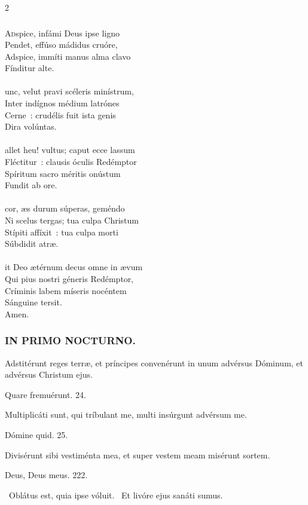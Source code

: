 \documentclass[9pt,twoside]{extarticle}
\begin{document}
\begin{multicols}{2}
{{\subsubsection*{\center{}}
\lettrine{A}dspice, infámi Deus ipse ligno\\
Pendet, effúso mádidus cruóre,\\
Adspice, immíti manus alma clavo\\
Fínditur alte.\\
\\
unc, velut pravi scéleris minístrum,\\
Inter indígnos médium latrónes\\
Cerne~: crudélis fuit ista genis\\
Dira volúntas.\\
\\
allet heu! vultus; caput ecce lassum\\
Fléctitur~: clausis óculis Redémptor\\
Spíritum sacro méritis onústum\\
Fundit ab ore.\\
\\
 cor, æs durum súperas, geméndo\\
Ni scelus tergas; tua culpa Christum\\
Stípiti affíxit~: tua culpa morti\\
Súbdidit atræ.\\
\\
it Deo ætérnum decus omne in ævum\\
Qui pius nostri géneris Redémptor,\\
Críminis labem míseris nocéntem\\
Sánguine tersit.\\
Amen.

\subsubsection*{\center \textsc{IN PRIMO NOCTURNO.}}
\begin{tightlist}{}
\item {} Adstitérunt reges terræ, et príncipes convenérunt in unum advérsus Dóminum, et advérsus Christum ejus.
\item {} Quare fremuérunt. 24.
\item {} Multiplicáti sunt, qui tríbulant me, multi insúrgunt advérsum me.
\item {} Dómine quid. 25.
\item {} Divisérunt sibi vestiménta mea, et super vestem meam misérunt sortem.
\item {} Deus, Deus meus. 222.
\item {}~Oblátus est, quia ipse vóluit. ~Et livóre ejus sanáti sumus.
\item {}
\end{tightlist}

}}
\end{multicols}
\end{document}
